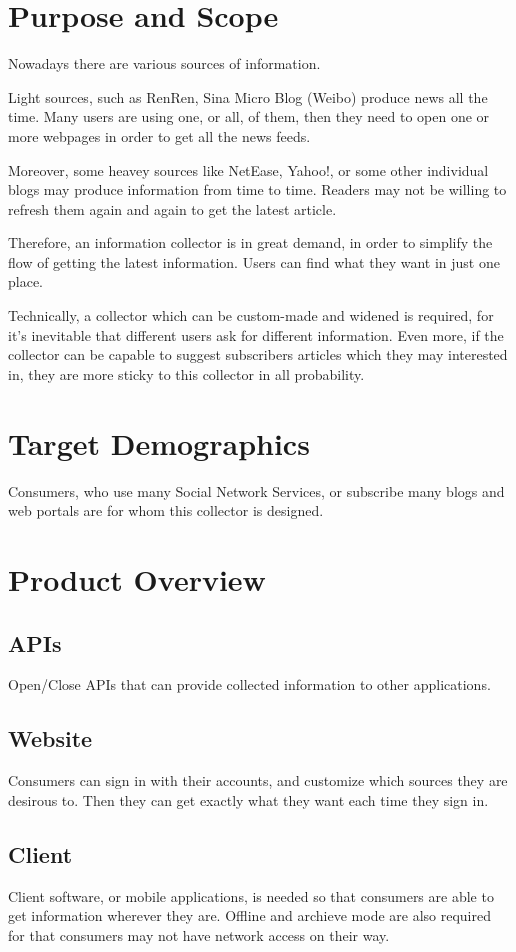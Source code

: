\section{Purpose and Scope}
  Nowadays there are various sources of information.

  Light sources, such as RenRen, Sina Micro Blog (Weibo) produce news all the time.
  Many users are using one, or all, of them, then they need to open one or more webpages in order to get all the news feeds.

  Moreover, some heavey sources like NetEase, Yahoo!, or some other individual blogs may produce information from time to time.
  Readers may not be willing to refresh them again and again to get the latest article.

  Therefore, an information collector is in great demand, in order to simplify the flow of getting the latest information.
  Users can find what they want in just one place.

  Technically, a collector which can be custom-made and widened is required, for it's inevitable that different users ask for different information.
  Even more, if the collector can be capable to suggest subscribers articles which they may interested in, they are more sticky to this collector in all probability.

\section{Target Demographics}
  Consumers, who use many Social Network Services, or subscribe many blogs and web portals are for whom this collector is designed.

\section{Product Overview}
  \subsection{APIs}
    Open/Close APIs that can provide collected information to other applications.
  \subsection{Website}
    Consumers can sign in with their accounts, and customize which sources they are desirous to.
    Then they can get exactly what they want each time they sign in.
  \subsection{Client}
    Client software, or mobile applications, is needed so that consumers are able to get information wherever they are.
    Offline and archieve mode are also required for that consumers may not have network access on their way.

